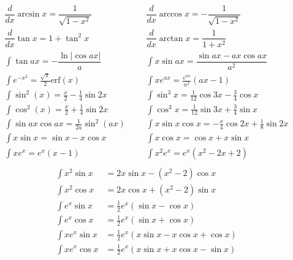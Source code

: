 \begin{align*}
	\dfrac{d}{dx}\arcsin x = \dfrac{1}{\sqrt{1-x^2}} &&& \dfrac{d}{dx}\arccos x = -\dfrac{1}{\sqrt{1-x^2}} \\
	\dfrac{d}{dx}\tan x = 1+\tan^2 x &&& \dfrac{d}{dx}\arctan x = \dfrac{1}{1+x^2} \\
	\int\tan ax = -\dfrac{\ln|\cos ax|}{a} &&& \int x\sin ax = \dfrac{\sin ax-ax \cos ax}{a^2} \\
	\int e^{-x^2} = \frac{\sqrt \pi}{2} \text{erf}(x) &&& \int xe^{ax} = \frac{e^{ax}}{a^2}(ax-1) \\
    \int \sin^2(x) = \frac{x}{2} - \frac{1}{4} \sin 2x &&& \int \sin^3 x = \frac{1}{12}\cos 3x - \frac{3}{4} \cos x \\
    \int \cos^2(x) = \frac{x}{2} + \frac{1}{4} \sin 2x &&& \int \cos^3 x = \frac{1}{12}\sin 3x + \frac{3}{4} \sin x \\
    \int \sin ax \cos ax = \frac{1}{2a}\sin^2(ax) &&& \int x \sin x \cos x = -\frac{x}{4}\cos 2x + \frac{1}{8} \sin 2x \\
    \int x \sin x = \sin x - x \cos x &&& \int x \cos x = \cos x + x \sin x \\
    \int xe^x = e^x(x - 1) &&& \int x^2 e^x = e^x(x^2 - 2x + 2) \\
\end{align*}
\vspace{-1cm}
\begin{align*}
    \int x^2 \sin x &= 2x \sin x - (x^2 - 2) \cos x \\
    \int x^2 \cos x &= 2x \cos x + (x^2 - 2) \sin x \\
    \int e^x \sin x &= \frac{1}{2}e^x (\sin x - \cos x) \\
    \int e^x \cos x &= \frac{1}{2}e^x (\sin x + \cos x) \\
    \int xe^x \sin x &= \frac{1}{2}e^x (x \sin x - x \cos x + \cos x) \\
    \int xe^x \cos x &= \frac{1}{2}e^x (x \sin x + x \cos x - \sin x)
\end{align*}
